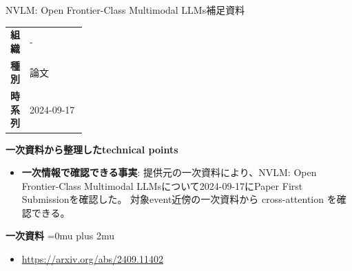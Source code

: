\begin{technicalnote}{NVLM: Open Frontier-Class Multimodal LLMs}{補足資料}
\begingroup
\begin{tabularx}{\linewidth}{@{}>{\bfseries}p{0.22\linewidth}X@{}}
組織 & - \\
種別 & 論文 \\
時系列 & 2024-09-17 \\
\end{tabularx}
\smallskip
{\bfseries 一次資料から整理したtechnical points}
\begin{itemize}[leftmargin=1.5em,itemsep=0.35em]
\item \textbf{一次情報で確認できる事実}: 提供元の一次資料により、NVLM: Open Frontier-Class Multimodal LLMsについて2024-09-17にPaper First Submissionを確認した。 対象event近傍の一次資料から cross-attention を確認できる。
\end{itemize}
\begin{minipage}{\linewidth}
\begin{samepage}
{\bfseries 一次資料}
\begingroup\sloppy
\Urlmuskip=0mu plus 2mu\relax
\begin{itemize}[leftmargin=1.5em,itemsep=0.25em]
\item {\scriptsize\url{https://arxiv.org/abs/2409.11402}}
\end{itemize}
\endgroup
\end{samepage}
\end{minipage}
\endgroup
\end{technicalnote}
\medskip

